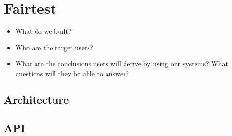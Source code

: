 \section{Fairtest}
\label{sect:fairtest}

\begin{itemize}
  \item What do we built?
  \item Who are the target users?
  \item What are the conclusions users will derive by using our systems?
    What questions will they be able to answer?
\end{itemize}

\subsection{Architecture}


\subsection{API}


